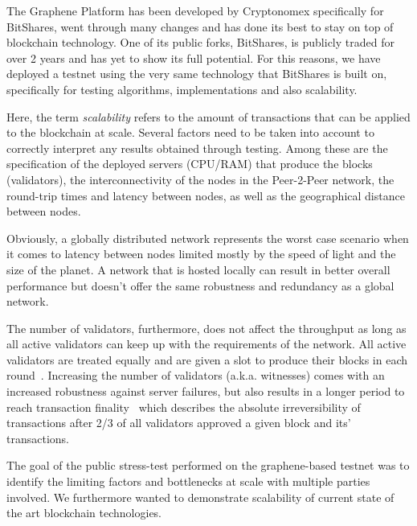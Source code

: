 The Graphene Platform has been developed by Cryptonomex specifically for
BitShares, went through many changes and has done its best to stay on top of
blockchain technology. One of its public forks, BitShares, is publicly traded
for over 2 years and has yet to show its full potential. For this reasons, we
have deployed a testnet using the very same technology that BitShares is built
on, specifically for testing algorithms, implementations and also scalability.

Here, the term \emph{scalability} refers to the amount of transactions that can
be applied to the blockchain at scale. Several factors need to be taken into
account to correctly interpret any results obtained through testing. Among
these are the specification of the deployed servers (CPU/RAM) that produce the
blocks (validators), the interconnectivity of the nodes in the Peer-2-Peer
network, the round-trip times and latency between nodes, as well as the
geographical distance between nodes.

Obviously, a globally distributed network represents the worst case scenario
when it comes to latency between nodes limited mostly by the speed of light and
the size of the planet. A network that is hosted locally can result in better
overall performance but doesn't offer the same robustness and redundancy as a
global network.

The number of validators, furthermore, does not affect the throughput as long
as all active validators can keep up with the requirements of the network. All
active validators are treated equally and are given a slot to produce their
blocks in each round~\cite{bts:general}. Increasing the number of validators
(a.k.a. witnesses) comes with an increased robustness against server failures,
but also results in a longer period to reach transaction
finality~\cite{bts:general} which describes the absolute irreversibility of
transactions after 2/3 of all validators approved a given block and its'
transactions.

The goal of the public stress-test performed on the graphene-based testnet was
to identify the limiting factors and bottlenecks at scale with multiple parties
involved. We furthermore wanted to demonstrate scalability of current state of
the art blockchain technologies.
